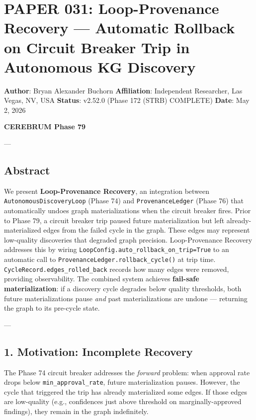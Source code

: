 \section{PAPER 031: Loop-Provenance Recovery — Automatic Rollback on Circuit Breaker Trip in Autonomous KG Discovery}

\textbf{Author}: Bryan Alexander Buchorn  
\textbf{Affiliation}: Independent Researcher, Las Vegas, NV, USA  
\textbf{Status}: v2.52.0 (Phase 172 (STRB) COMPLETE)
\textbf{Date}: May 2, 2026

\textbf{CEREBRUM Phase 79}

---

\subsection{Abstract}

We present \textbf{Loop-Provenance Recovery}, an integration between \texttt{AutonomousDiscoveryLoop} (Phase 74) and \texttt{ProvenanceLedger} (Phase 76) that autom\-atically undoes graph mater\-ializations when the circuit breaker fires. Prior to Phase 79, a circuit breaker trip paused future mater\-ialization but left already-mater\-ialized edges from the failed cycle in the graph. These edges may represent low-quality discoveries that degraded graph precision. Loop-Provenance Recovery addresses this by wiring \texttt{LoopConfig.auto\_rollback\_on\_trip=True} to an automatic call to \texttt{ProvenanceLedger.rollback\_cycle()} at trip time. \texttt{CycleRecord.edges\_rolled\_back} records how many edges were removed, providing obser\-vability. The combined system achieves \textbf{fail-safe mater\-ialization}: if a discovery cycle degrades below quality thresholds, both future mater\-ializations pause \textit{and} past mater\-ializations are undone — returning the graph to its pre-cycle state.

---

\subsection{1. Motivation: Incomplete Recovery}

The Phase 74 circuit breaker addresses the \textit{forward} problem: when approval rate drops below \texttt{min\_approval\_rate}, future mater\-ialization pauses. However, the cycle that triggered the trip has already mater\-ialized some edges. If those edges are low-quality (e.g., confidences just above threshold on marginally-approved findings), they remain in the graph indef\-initely.

